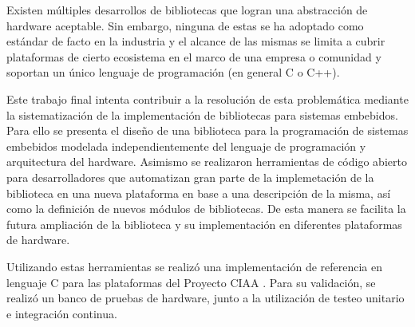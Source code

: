 Existen múltiples desarrollos de bibliotecas que logran una abstracción de hardware aceptable. Sin embargo, ninguna de estas se ha adoptado como estándar de facto en la industria y el alcance de las mismas se limita a cubrir plataformas de cierto ecosistema en el marco de una empresa o comunidad y soportan un único lenguaje de programación (en general C o C++).

Este trabajo final intenta contribuir a la resolución de esta problemática mediante la sistematización de la implementación de bibliotecas para sistemas embebidos. Para ello se presenta el diseño de una biblioteca para la programación de sistemas embebidos modelada independientemente del lenguaje de programación y arquitectura del hardware. Asimismo se realizaron herramientas de código abierto para desarrolladores que automatizan gran parte de la implemetación de la biblioteca en una nueva plataforma en base a una descripción de la misma, así como la definición de nuevos módulos de bibliotecas. De esta manera se facilita la futura ampliación de la biblioteca y su implementación en diferentes plataformas de hardware.		

Utilizando estas herramientas se realizó una implementación de referencia en lenguaje C para las plataformas del Proyecto CIAA \citep{CIAA}.
Para su validación, se realizó un banco de pruebas de hardware, junto a la utilización de testeo unitario e integración continua.
